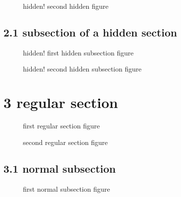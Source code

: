 \begin{figure}
\centering
{}
\caption[]{hidden! second hidden figure}\label{fig:fig_h2}
\end{figure}

\subsection{2.1 subsection of a hidden
section}\label{subsection-of-a-hidden-section}

\begin{figure}
\centering
{}
\caption[]{hidden! first hidden subsection figure}\label{fig:fig_h1_s}
\end{figure}

\begin{figure}
\centering
{}
\caption[]{hidden! second hidden subsection figure}\label{fig:fig_h2_s}
\end{figure}

\section{3 regular section}\label{regular-section}

\begin{figure}
\centering
{}
\caption{first regular section figure}\label{fig:fig_r1}
\end{figure}

\begin{figure}
\centering
{}
\caption{second regular section figure}\label{fig:fig_r2}
\end{figure}

\subsection{3.1 normal subsection}\label{normal-subsection}

\begin{figure}
\centering
{}
\caption{first normal subsection figure}\label{fig:fig_nss1}
\end{figure}

